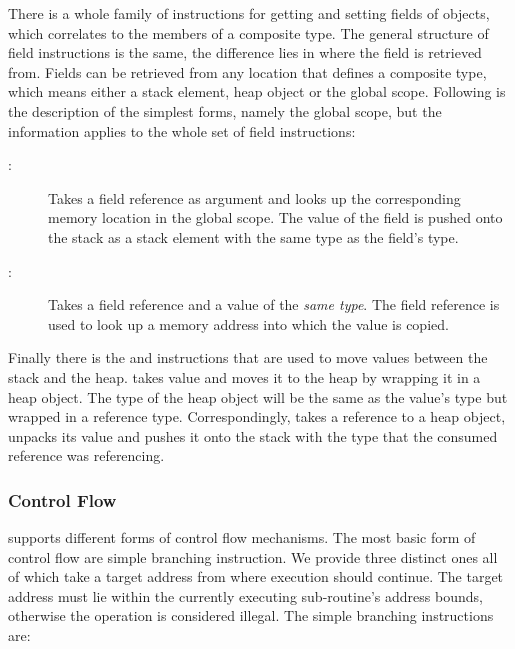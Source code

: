 There is a whole family of instructions for getting and setting fields of
objects, which correlates to the members of a composite type. The general
structure of field instructions is the same, the difference lies in where the
field is retrieved from. Fields can be retrieved from any location that defines
a composite type, which means either a stack element, heap object or the global
scope. Following is the description of the simplest forms, namely the global
scope, but the information applies to the whole set of field instructions:

\begin{description}

\item[:]

  Takes a field reference as argument and looks up the corresponding memory
  location in the global scope. The value of the field is pushed onto the stack
  as a stack element with the same type as the field's type.

\item[:]

  Takes a field reference and a value of the \emph{same type}. The field
  reference is used to look up a memory address into which the value is copied.

\end{description}

Finally there is the  and  instructions that are used to
move values between the stack and the heap.  takes value and moves it
to the heap by wrapping it in a heap object. The type of the heap object will be
the same as the value's type but wrapped in a reference type. Correspondingly,
 takes a reference to a heap object, unpacks its value and pushes
it onto the stack with the type that the consumed reference was referencing.

\subsubsection{Control Flow}
\label{sec:design:isa:control-flow}

\thename{} supports different forms of control flow mechanisms. The most basic
form of control flow are simple branching instruction. We provide three distinct
ones all of which take a target address from where execution should
continue. The target address must lie within the currently executing
sub-routine's address bounds, otherwise the operation is considered illegal. The
simple branching instructions are:

